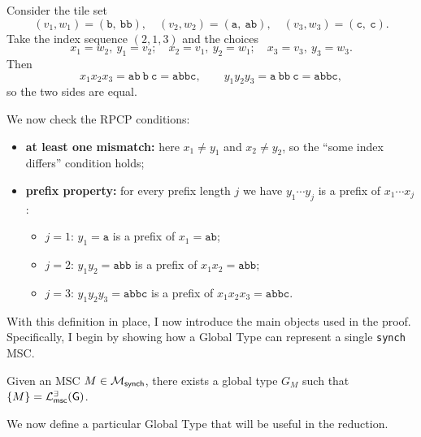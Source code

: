 \bigskip

\begin{example}\label{exmp:rpcp}
Consider the tile set
\[
(v_1,w_1)=(\texttt{b},\ \texttt{bb}),\quad
(v_2,w_2)=(\texttt{a},\ \texttt{ab}),\quad
(v_3,w_3)=(\texttt{c},\ \texttt{c}).
\]
Take the index sequence $(2,1,3)$ and the choices
\[
x_1 = w_2,\ y_1 = v_2;\quad
x_2 = v_1,\ y_2 = w_1;\quad
x_3 = v_3,\ y_3 = w_3.
\]
Then
\[
x_1 x_2 x_3 = \texttt{ab}\ \texttt{b}\ \texttt{c} = \texttt{abbc},
\qquad
y_1 y_2 y_3 = \texttt{a}\ \texttt{bb}\ \texttt{c} = \texttt{abbc},
\]
so the two sides are equal.

We now check the RPCP conditions:
\begin{itemize}
  \item \textbf{at least one mismatch:} here $x_1\neq y_1$ and
        $x_2\neq y_2$, so the ``some index differs'' condition holds;
  \item \textbf{prefix property:} for every prefix length $j$ we have
        $y_{1}\cdots y_{j}$ is a prefix of $x_{1}\cdots x_{j}$:
        \begin{itemize}
          \item $j=1$: $y_1=\texttt{a}$ is a prefix of $x_1=\texttt{ab}$;
          \item $j=2$: $y_1y_2=\texttt{abb}$ is a prefix of $x_1x_2=\texttt{abb}$;
          \item $j=3$: $y_1y_2y_3=\texttt{abbc}$ is a prefix of $x_1x_2x_3=\texttt{abbc}$.
        \end{itemize}
\end{itemize}
\end{example}


With this definition in place, I now introduce the main objects used 
in the proof. Specifically, I begin by showing how a Global Type can 
represent a single \verb|synch| MSC.

\bigskip

\begin{definition}[$G_M$]\label{def:gm}
	Given an MSC $M\in \mathcal{M}_{\mathsf{synch}}$, there exists a
	global type $G_M$ such that $\{M\} = \mathcal{L}_{\mathsf{msc}}^{\exists}(\mathsf{G})$.
\end{definition}

We now define a particular Global Type that will be useful in the reduction.

\bigskip

